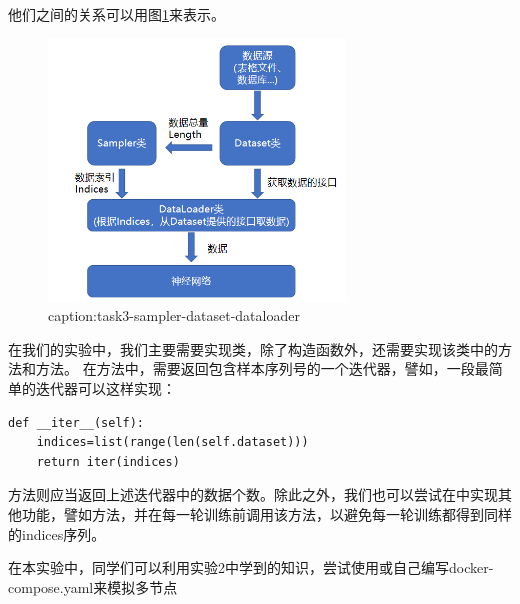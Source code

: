 他们之间的关系可以用图\ref{fig:task3-sampler-dataset-dataloader}来表示。
\begin{figure}[htbp]
	\centering
	\includegraphics[width=0.7\textwidth]{figures/task3-sampler-dataset-dataloader.png}
	\caption{caption:task3-sampler-dataset-dataloader}
	\label{fig:task3-sampler-dataset-dataloader}
\end{figure}

在我们的实验中，我们主要需要实现类，除了构造函数外，还需要实现该类中的方法和方法。
在方法中，需要返回包含样本序列号的一个迭代器，譬如，一段最简单的迭代器可以这样实现：
\begin{lstlisting}
def __iter__(self):
    indices=list(range(len(self.dataset)))
    return iter(indices)
\end{lstlisting}

方法则应当返回上述迭代器中的数据个数。除此之外，我们也可以尝试在中实现其他功能，譬如方法，并在每一轮训练前调用该方法，以避免每一轮训练都得到同样的indices序列。


在本实验中，同学们可以利用实验2中学到的知识，尝试使用或自己编写docker-compose.yaml来模拟多节点~

